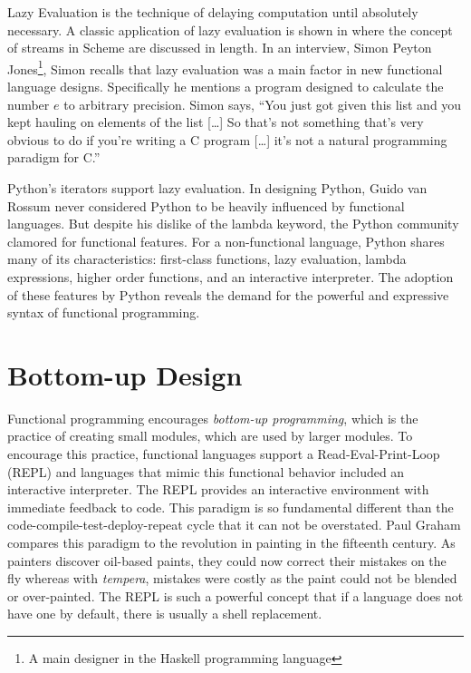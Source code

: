 \documentclass[prodmode]{acmlarge}
\begin{document}
Lazy Evaluation is the technique of delaying computation until
absolutely necessary.  A classic application of lazy evaluation is
shown in \cite{Abelson1996} where the concept of streams in Scheme are
discussed in length.  In an interview, Simon Peyton Jones\footnote{A
  main designer in the Haskell programming language}, Simon recalls
that lazy evaluation was a main factor in new functional language
designs\cite{Seibel2009}.  Specifically he mentions a program designed
to calculate the number $e$ to arbitrary precision.  Simon says, ``You
just got given this list and you kept hauling on elements of the list
[\ldots] So that's not something that's very obvious to do if you're
writing a C program [\ldots] it's not a natural programming paradigm
for C.''

Python's iterators support lazy evaluation.  In designing Python,
Guido van Rossum never considered Python to be heavily influenced by
functional languages\cite{Guido2009}.  But despite his dislike of the
lambda keyword, the Python community clamored for functional features.
For a non-functional language, Python shares many of its
characteristics: first-class functions, lazy evaluation, lambda
expressions, higher order functions, and an interactive interpreter.
The adoption of these features by Python reveals the demand for
the powerful and expressive syntax of functional programming.

\section{Bottom-up Design}

Functional programming encourages \emph{bottom-up programming}, which
is the practice of creating small modules, which are used by larger
modules.  To encourage this practice, functional languages support a
Read-Eval-Print-Loop (REPL) and languages that mimic this functional
behavior included an interactive interpreter.  The REPL provides an
interactive environment with immediate feedback to code.  This
paradigm is so fundamental different than the
code-compile-test-deploy-repeat cycle that it can not be overstated.
Paul Graham compares this paradigm to the revolution in painting in
the fifteenth century.  As painters discover oil-based paints, they
could now correct their mistakes on the fly whereas with
\emph{tempera}, mistakes were costly as the paint could not be blended
or over-painted\cite{Graham:1995:ACL:229872}.  The REPL is such a
powerful concept that if a language does not have one by default,
there is usually a shell replacement\cite{REPL}.
\end{document}
